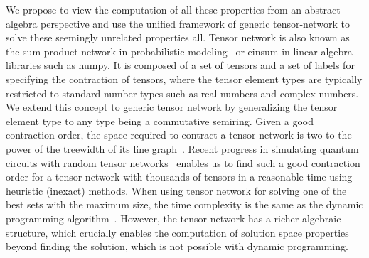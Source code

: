 \documentclass[onefignum, onetabnum]{siamart190516}
\newcommand{\<}{\langle}
\renewcommand{\>}{\rangle}
\newcommand{\blue}[1]{[{\bf  \color{blue}{JG: #1}}]}
\newcommand{\purple}[1]{[{\bf  \color{purple}{MC: #1}}]}
\begin{document}
We propose to view the computation of all these properties from an abstract algebra perspective and use the unified framework of
generic tensor-network to solve these seemingly unrelated properties all.
Tensor network is also known as the sum product network in probabilistic modeling~\cite{Bishop2006} or einsum in linear algebra libraries such as numpy.
It is composed of a set of tensors and a set of labels for specifying the contraction of tensors,
where the tensor element types are typically restricted to standard number types such as real numbers and complex numbers.
We extend this concept to generic tensor network by generalizing the tensor element type to any type being a commutative semiring.
Given a good contraction order, the space required to contract a tensor network is
two to the power of the treewidth of its line graph~\cite{Markov2008}.
Recent progress in simulating quantum circuits with random tensor networks~\cite{Gray2021, Pan2021, Kalachev2021} enables us to find such a good contraction order for a tensor network with thousands of tensors in a reasonable time using heuristic (inexact) methods.
When using tensor network for solving one of the best sets with the maximum size,
the time complexity is the same as the dynamic programming algorithm~\cite{Courcelle1990, Fomin2013}.
However, the tensor network has a richer algebraic structure, which crucially enables the computation of solution space properties beyond finding the solution, which is not possible with dynamic programming.
\end{document}
